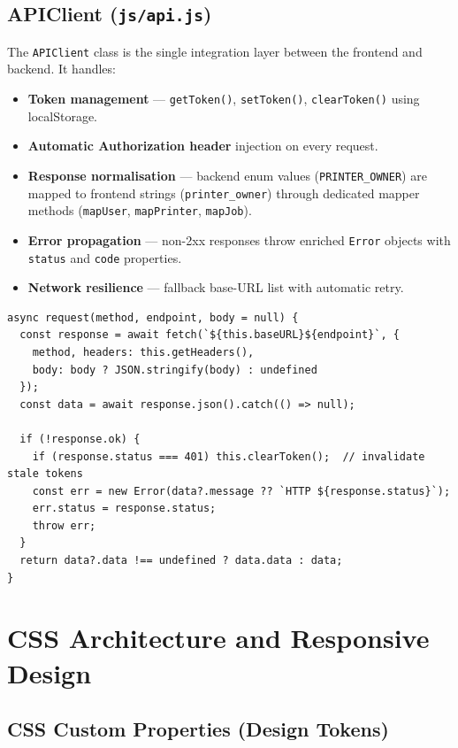 \documentclass[12pt,a4paper]{report}
\begin{document}
\subsection{APIClient (\texttt{js/api.js})}

The \texttt{APIClient} class is the single integration layer between the frontend and
backend. It handles:
\begin{itemize}
  \item \textbf{Token management} — \texttt{getToken()}, \texttt{setToken()},
    \texttt{clearToken()} using localStorage.
  \item \textbf{Automatic Authorization header} injection on every request.
  \item \textbf{Response normalisation} — backend enum values (\texttt{PRINTER\_OWNER})
    are mapped to frontend strings (\texttt{printer\_owner}) through dedicated mapper
    methods (\texttt{mapUser}, \texttt{mapPrinter}, \texttt{mapJob}).
  \item \textbf{Error propagation} — non-2xx responses throw enriched \texttt{Error}
    objects with \texttt{status} and \texttt{code} properties.
  \item \textbf{Network resilience} — fallback base-URL list with automatic retry.
\end{itemize}

\begin{lstlisting}[style=jsStyle, caption={Core request method with 401 token cleanup}]
async request(method, endpoint, body = null) {
  const response = await fetch(`${this.baseURL}${endpoint}`, {
    method, headers: this.getHeaders(),
    body: body ? JSON.stringify(body) : undefined
  });
  const data = await response.json().catch(() => null);

  if (!response.ok) {
    if (response.status === 401) this.clearToken();  // invalidate stale tokens
    const err = new Error(data?.message ?? `HTTP ${response.status}`);
    err.status = response.status;
    throw err;
  }
  return data?.data !== undefined ? data.data : data;
}
\end{lstlisting}

\section{CSS Architecture and Responsive Design}

\subsection{CSS Custom Properties (Design Tokens)}
\end{document}
